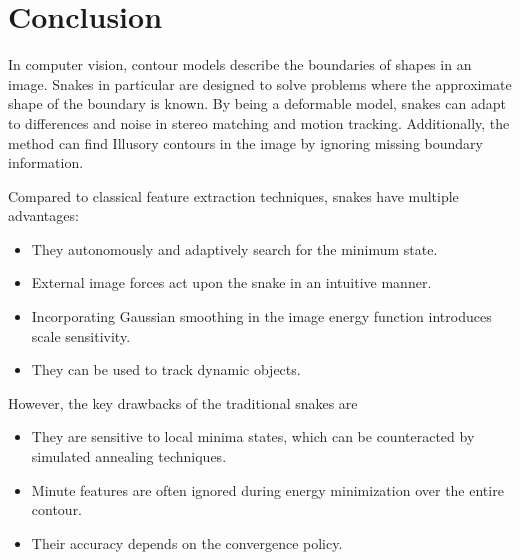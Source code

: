 \documentclass[journal]{IEEEtran}
\begin{document}
\section{Conclusion}
In computer vision, contour models describe the boundaries of shapes in an image. Snakes in particular are designed to solve problems where the approximate shape of the boundary is known. By being a deformable model, snakes can adapt to differences and noise in stereo matching and motion tracking. Additionally, the method can find Illusory contours in the image by ignoring missing boundary information.

Compared to classical feature extraction techniques, snakes have multiple advantages:
\begin{itemize}
  \item They autonomously and adaptively search for the minimum state.
  \item External image forces act upon the snake in an intuitive manner.
  \item Incorporating Gaussian smoothing in the image energy function introduces scale sensitivity.
  \item They can be used to track dynamic objects.
\end{itemize}

However, the key drawbacks of the traditional snakes are
\begin{itemize}
  \item They are sensitive to local minima states, which can be counteracted by simulated annealing techniques.
  \item Minute features are often ignored during energy minimization over the entire contour.
  \item Their accuracy depends on the convergence policy.\cite{w2}
\end{itemize}





\end{document}
